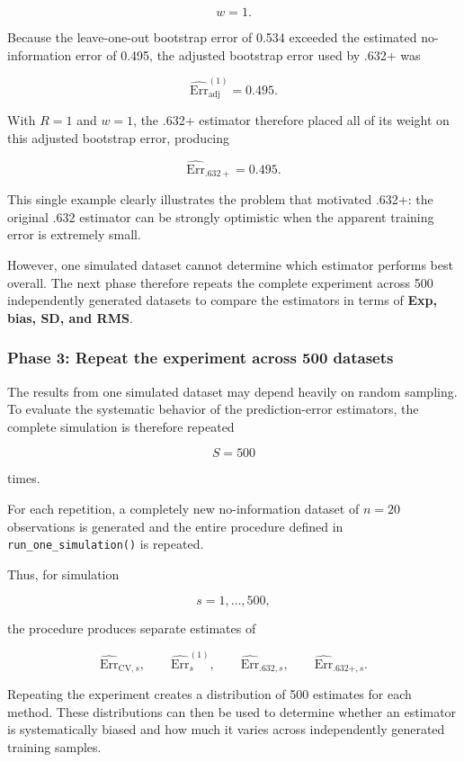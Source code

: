 \documentclass[
  letterpaper,
  DIV=11,
  numbers=noendperiod]{scrreprt}
\begin{document}
\[
w=1.
\]

Because the leave-one-out bootstrap error of 0.534 exceeded the
estimated no-information error of 0.495, the adjusted bootstrap error
used by .632+ was

\[
\widehat{\mathrm{Err}}_{\mathrm{adj}}^{(1)}=0.495.
\]

With \(R=1\) and \(w=1\), the .632+ estimator therefore placed all of
its weight on this adjusted bootstrap error, producing

\[
\widehat{\mathrm{Err}}_{.632+}=0.495.
\]

This single example clearly illustrates the problem that motivated
.632+: the original .632 estimator can be strongly optimistic when the
apparent training error is extremely small.

However, one simulated dataset cannot determine which estimator performs
best overall. The next phase therefore repeats the complete experiment
across 500 independently generated datasets to compare the estimators in
terms of \textbf{Exp, bias, SD, and RMS}.

\subsubsection{Phase 3: Repeat the experiment across 500
datasets}\label{phase-3-repeat-the-experiment-across-500-datasets}

The results from one simulated dataset may depend heavily on random
sampling. To evaluate the systematic behavior of the prediction-error
estimators, the complete simulation is therefore repeated

\[
S=500
\]

times.

For each repetition, a completely new no-information dataset of \(n=20\)
observations is generated and the entire procedure defined in
\texttt{run\_one\_simulation()} is repeated.

Thus, for simulation

\[
s=1,\ldots,500,
\]

the procedure produces separate estimates of

\[
\widehat{\mathrm{Err}}_{\mathrm{CV},s},
\qquad
\widehat{\mathrm{Err}}^{(1)}_s,
\qquad
\widehat{\mathrm{Err}}_{.632,s},
\qquad
\widehat{\mathrm{Err}}_{.632+,s}.
\]

Repeating the experiment creates a distribution of 500 estimates for
each method. These distributions can then be used to determine whether
an estimator is systematically biased and how much it varies across
independently generated training samples.
\end{document}
